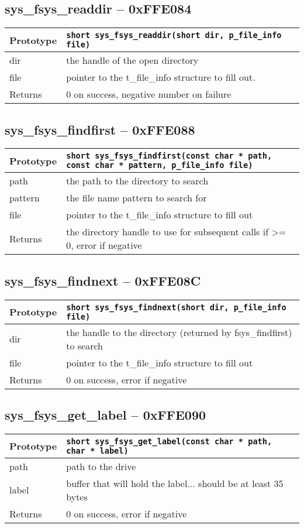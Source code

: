 \subsection*{sys\_fsys\_readdir -- 0xFFE084}
\begin{tabular}{|l||l|} \hline
Prototype & \lstinline!short sys_fsys_readdir(short dir, p_file_info file)! \\ \hline
dir & the handle of the open directory \\ \hline
file & pointer to the t\_file\_info structure to fill out. \\ \hline
Returns & 0 on success, negative number on failure \\ \hline
\end{tabular}

\subsection*{sys\_fsys\_findfirst -- 0xFFE088}
\begin{tabular}{|l||l|} \hline
Prototype & \lstinline!short sys_fsys_findfirst(const char * path, const char * pattern, p_file_info file)! \\ \hline
path & the path to the directory to search \\ \hline
pattern & the file name pattern to search for \\ \hline
file & pointer to the t\_file\_info structure to fill out \\ \hline
Returns & the directory handle to use for subsequent calls if >= 0, error if negative \\ \hline
\end{tabular}

\subsection*{sys\_fsys\_findnext -- 0xFFE08C}
\begin{tabular}{|l||l|} \hline
Prototype & \lstinline!short sys_fsys_findnext(short dir, p_file_info file)! \\ \hline
dir & the handle to the directory (returned by fsys\_findfirst) to search \\ \hline
file & pointer to the t\_file\_info structure to fill out \\ \hline
Returns & 0 on success, error if negative \\ \hline
\end{tabular}

\subsection*{sys\_fsys\_get\_label -- 0xFFE090}
\begin{tabular}{|l||l|} \hline
Prototype & \lstinline!short sys_fsys_get_label(const char * path, char * label)! \\ \hline
path & path to the drive \\ \hline
label & buffer that will hold the label... should be at least 35 bytes \\ \hline
Returns & 0 on success, error if negative \\ \hline
\end{tabular}

